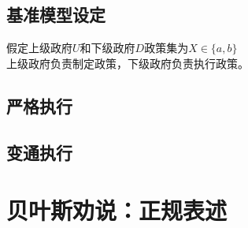 \documentclass{beamer}
\begin{document}
\subsection{基准模型设定}

\begin{frame}
	假定上级政府$U$和下级政府$D$政策集为$X\in\{a,b\}$\\
	上级政府负责制定政策，下级政府负责执行政策。\\
\end{frame}
\subsection{严格执行}

\subsection{变通执行}

\section{贝叶斯劝说：正规表述}
\end{document}
